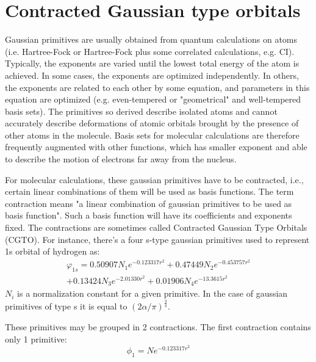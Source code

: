 \section{Contracted Gaussian type orbitals}
%
%
Gaussian primitives are usually obtained from quantum calculations on
atoms (i.e. Hartree-Fock or Hartree-Fock plus some correlated
calculations, e.g. CI). Typically, the exponents are varied until the
lowest total energy of the atom is achieved. In some cases, the
exponents are optimized independently. In others, the exponents are
related to each other by some equation, and parameters in this
equation are optimized (e.g. even-tempered or "geometrical" and
well-tempered basis sets). The primitives so derived describe isolated
atoms and cannot accurately describe deformations of atomic orbitals
brought by the presence of other atoms in the molecule.  Basis sets
for molecular calculations are therefore frequently augmented with
other functions, which has smaller exponent and able to describe the
motion of electrons far away from the nucleus.

For molecular calculations, these gaussian primitives have to be
contracted, i.e., certain linear combinations of them will be used as
basis functions. The term contraction means "a linear combination of
gaussian primitives to be used as basis function".  Such a basis
function will have its coefficients and exponents fixed. The
contractions are sometimes called Contracted Gaussian Type Orbitals
(CGTO). For instance, there's a four s-type gaussian primitives used
to represent 1s orbital of hydrogen as:
\begin{multline}\label{}
  \varphi_{1s} = 0.50907N_{1}e^{-0.123317r^{2}} +
  0.47449N_{2}e^{-0.453757r^{2}} \\
  + 0.13424N_{3}e^{-2.01330r^{2}} + 0.01906N_{4}e^{-13.3615r^{2}}
\end{multline}
$N_{i}$ is a normalization constant for a given primitive. In the case
of gaussian primitives of type s it is equal to
$(2\alpha/\pi)^{\frac{3}{4}}$.

These primitives may be grouped in 2 contractions. The first
contraction contains only 1 primitive:
\begin{equation}\label{}
  \phi_{1} = Ne^{-0.123317r^{2}}
\end{equation}


